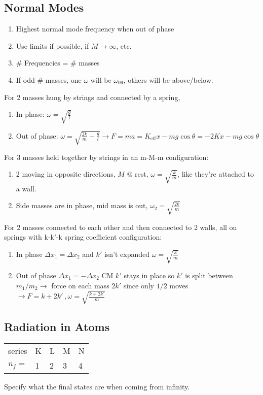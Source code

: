 \documentclass[10pt,a4paper]{article}
\begin{document}
\subsection{Normal Modes}
\begin{enumerate}
    \item Highest normal mode frequency when out of phase
    \item Use limits if possible, if $M \rightarrow \infty$, etc.
    \item \# Frequencies = \# masses
    \item If odd \# masses, one $\omega$ will be $\omega_09$, others will be above/below.
\end{enumerate}
For 2 masses hung by strings and connected by a spring,
\begin{enumerate}
    \item In phase: $\omega = \sqrt{\frac{g}{l}}$
    \item Out of phase: $\omega = \sqrt{\frac{2k}{m} + \frac{g}{l}} \rightarrow F = ma = K_{\textrm{eff}}x - mg\cos \theta = -2Kx - mg \cos \theta$
\end{enumerate}
For 3 masses held together by strings in an m-M-m configuration:
\begin{enumerate}
    \item 2 moving in opposite directions, $M$ @ rest, $\omega= \sqrt{\frac{k}{m}}$, like they're attached to a wall.
    \item Side masses are in phase, mid mass is out, $\omega_2 = \sqrt{\frac{2k}{m}}$
\end{enumerate}
For 2 masses connected to each other and then connected to 2 walls, all on springs with k-k'-k spring coefficient configuration:
\begin{enumerate}
    \item In phase $\Delta x_1 = \Delta x_2$ and $k'$ isn't expanded $\omega = \sqrt{\frac{k}{m}}$
    \item Out of phase $\Delta x_1 = -\Delta x_2$ CM $k'$ stays in place so $k'$ is split between $m_1/m_2 \rightarrow$ force on each mass $2k'$ since only $1/2$ moves $\rightarrow F = k + 2k'~,\omega = \sqrt{\frac{k + 2k'}{m}}$
\end{enumerate}

\subsection{Radiation in Atoms}
\begin{tabular}{r l l l l}
series & K & L & M & N\\
$n_f=$ & 1 & 2 & 3 & 4
\end{tabular}
Specify what the final states are when coming from infinity. 
\end{document}
